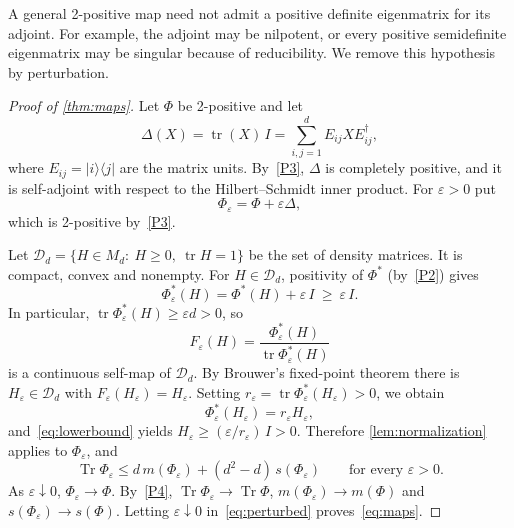 \documentclass[11pt,a4paper]{article}
\theoremstyle{plain}
\theoremstyle{definition}
\theoremstyle{remark}
\newtheorem{remark}[theorem]{Remark}
\numberwithin{equation}{section}
\newcommand{\M}{M_d}
\newcommand{\tr}{\operatorname{tr}}
\newcommand{\Tr}{\operatorname{Tr}}
\newcommand{\mmin}{m}
\newcommand{\smax}{s}
\newcommand{\cT}{\mathcal{T}}
\newcommand{\cD}{\mathcal{D}}
\newcommand{\ketbra}[2]{\lvert #1\rangle\langle #2\rvert}
\newcommand{\eps}{\varepsilon}
\begin{document}
A general 2-positive map need not admit a positive definite eigenmatrix
for its adjoint. For example, the adjoint may be nilpotent, or every
positive semidefinite eigenmatrix may be singular because of reducibility.
We remove this hypothesis by perturbation.

\begin{proof}[Proof of \cref{thm:maps}]
Let $\Phi$ be 2-positive and let
\[
  \Delta(X)=\tr(X)\,I=\sum_{i,j=1}^d E_{ij}XE_{ij}^\dagger ,
\]
where $E_{ij}=\ketbra{i}{j}$ are the matrix units. By~\ref{P3}, $\Delta$ is completely
positive, and it is self-adjoint with respect to the Hilbert--Schmidt inner product.
For $\eps>0$ put
\[
  \Phi_\eps=\Phi+\eps\Delta ,
\]
which is 2-positive by~\ref{P3}.

Let $\cD_d=\{H\in\M:\ H\ge0,\ \tr H=1\}$ be the set of density matrices. It is
compact, convex and nonempty. For $H\in\cD_d$, positivity of $\Phi^*$ (by~\ref{P2})
gives
\begin{equation}\label{eq:lowerbound}
  \Phi_\eps^*(H)=\Phi^*(H)+\eps\,I\ \ge\ \eps\,I .
\end{equation}
In particular, $\tr\Phi_\eps^*(H)\ge\eps d>0$, so
\[
  F_\eps(H)=\frac{\Phi_\eps^*(H)}{\tr\Phi_\eps^*(H)}
\]
is a continuous self-map of $\cD_d$. By Brouwer's fixed-point theorem there is
$H_\eps\in\cD_d$ with $F_\eps(H_\eps)=H_\eps$. Setting
$r_\eps=\tr\Phi_\eps^*(H_\eps)>0$, we obtain
\[
  \Phi_\eps^*(H_\eps)=r_\eps H_\eps ,
\]
and~\eqref{eq:lowerbound} yields $H_\eps\ge(\eps/r_\eps)\,I>0$. Therefore
\cref{lem:normalization} applies to $\Phi_\eps$, and
\begin{equation}\label{eq:perturbed}
  \Tr\Phi_\eps\le d\,\mmin(\Phi_\eps)+(d^2-d)\,\smax(\Phi_\eps)
  \qquad\text{for every }\eps>0 .
\end{equation}
As $\eps\downarrow0$, $\Phi_\eps\to\Phi$. By~\ref{P4}, $\Tr\Phi_\eps\to\Tr\Phi$,
$\mmin(\Phi_\eps)\to\mmin(\Phi)$ and $\smax(\Phi_\eps)\to\smax(\Phi)$. Letting
$\eps\downarrow0$ in~\eqref{eq:perturbed} proves~\eqref{eq:maps}.
\end{proof}

\end{document}
